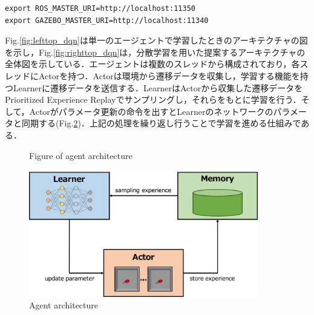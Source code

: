 \documentclass[12pt]{sonota/aislab}
\begin{document}
\begin{lstlisting}[basicstyle=\ttfamily\footnotesize, frame=single]
export ROS_MASTER_URI=http://localhost:11350
export GAZEBO_MASTER_URI=http://localhost:11340
\end{lstlisting}

Fig.\ref{fig:lefttop_dqn}は単一のエージェントで学習したときのアーキテクチャの図を示し，Fig.\ref{fig:righttop_dqn}は，分散学習を用いた提案するアーキテクチャの全体図を示している．エージェントは複数のスレッドから構成されており，各スレッドにActorを持つ．Actorは環境から遷移データを収集し，学習する機能を持つLearnerに遷移データを送信する．LearnerはActorから収集した遷移データをPrioritized Experience Replayでサンプリングし，それらをもとに学習を行う．そして，Actorがパラメータ更新の命令を出すとLearnerのネットワークのパラメータと同期する(Fig.\ref{agent_architecture})．上記の処理を繰り返し行うことで学習を進める仕組みである．

\begin{figure}[tbp]

	\begin{center}
	\hspace{10mm}
	\end{center}
	
	\caption{Figure of agent architecture}
	\label{fig:twofig_dqn}
\end{figure}

\begin{figure}[t]
\begin{center}
\includegraphics[clip, width=10cm]{figs/apex_agent_structure.eps}
\caption{Agent architecture}
\label{agent_architecture}
\end{center}
\end{figure}
\end{document}
